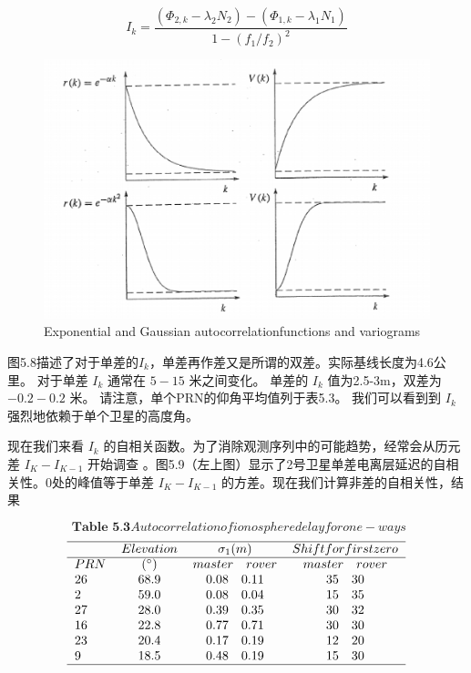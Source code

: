   
 \[ I_{k} =\frac{(\Phi_{2,k}-\lambda_{2}N_{2})-(\Phi_{1,k}-\lambda_{1}N_{1})}{1-(f_{1}/f_{2})^{2}} \]
 
 
\begin{figure}[h]
	\centering
	\includegraphics[width=0.7\linewidth]{TeX_files/Part02/chapter05/image/6}
	\caption{Exponential and Gaussian autocorrelationfunctions and variograms}
	\label{ }
\end{figure}

 
 图5.8描述了对于单差的$ I_ {k} $，单差再作差又是所谓的双差。实际基线长度为4.6公里。 对于单差 $ I_ {k} $ 通常在 $ 5-15 $ 米之间变化。 单差的 $ I_ {k} $ 值为2.5-3m，双差为 $ -0.2-0.2 $ 米。 请注意，单个PRN的仰角平均值列于表5.3。 我们可以看到到 $ I_ {k} $ 强烈地依赖于单个卫星的高度角。
 
 现在我们来看 $ I_ {k} $ 的自相关函数。为了消除观测序列中的可能趋势，经常会从历元差 $ I_ {K} -I_ {K-1} $ 开始调查 。图5.9（左上图）显示了2号卫星单差电离层延迟的自相关性。0处的峰值等于单差 $ I_ {K} -I_ {K-1} $ 的方差。现在我们计算非差的自相关性，结果
 
 \[\textbf{ Table 5.3} Autocorrelation of ionospheredelay for one-ways \] 
 \[ \begin{tabular}{lccc}
 \hline
 $ \quad$ & $ Elevation  $ & $\sigma_{1}(m)$&$Shift for firstzero  $ \\
 \cline{1-4}
 $ PRN$ & $ (^{\circ}) $ & $ master \quad rover $&$master \quad rover  $ \\
 $ 26$ & $ 68.9 $ & $ 0.08 \quad0.11 $&$35\quad 30  $ \\
 $ 2$ & $ 59.0 $ & $ 0.08 \quad0.04 $&$15\quad 35  $ \\
 $ 27$ & $ 28.0 $ & $ 0.39 \quad0.35 $&$30\quad 32  $ \\
 $ 16$ & $ 22.8 $ & $ 0.77 \quad0.71 $&$30\quad 30  $ \\
 $ 23$ & $ 20.4 $ & $ 0.17 \quad0.19 $&$12\quad 20  $ \\
 $ 9$ & $ 18.5 $ & $ 0.48 \quad0.19 $&$15\quad 30  $ \\
 
 \hline
 \end{tabular} \] 
 
